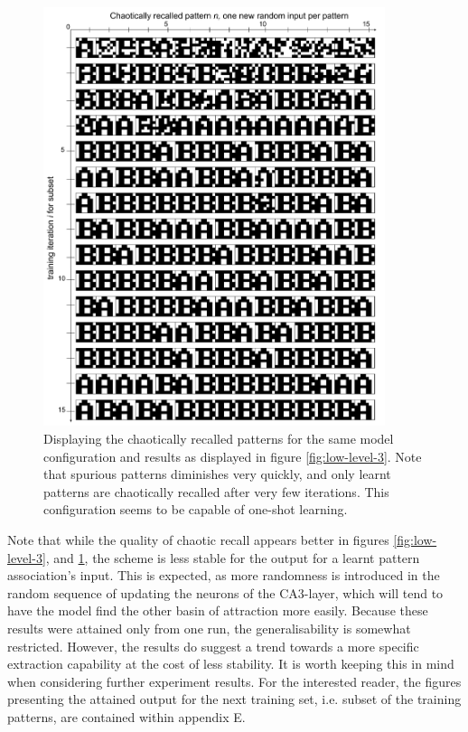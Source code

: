 \begin{figure}
    \centering
    \includegraphics[width=10cm]{fig/AB-chaotic-recall-async-tm0-dgw1-tau050}
    \caption{Displaying the chaotically recalled patterns for the same model configuration and results as displayed in figure \ref{fig:low-level-3}. Note that spurious patterns diminishes very quickly, and only learnt patterns are chaotically recalled after very few iterations. This configuration seems to be capable of one-shot learning.}
    \label{fig:low-level-4}
\end{figure}

Note that while the quality of chaotic recall appears better in figures \ref{fig:low-level-3}, and \ref{fig:low-level-4}, the scheme is less stable for the output for a learnt pattern association's input. This is expected, as more randomness is introduced in the random sequence of updating the neurons of the CA3-layer, which will tend to have the model find the other basin of attraction more easily. Because these results were attained only from one run, the generalisability is somewhat restricted. However, the results do suggest a trend towards a more specific extraction capability at the cost of less stability. It is worth keeping this in mind when considering further experiment results. For the interested reader, the figures presenting the attained output for the next training set, i.e. subset of the training patterns, are contained within appendix E.



